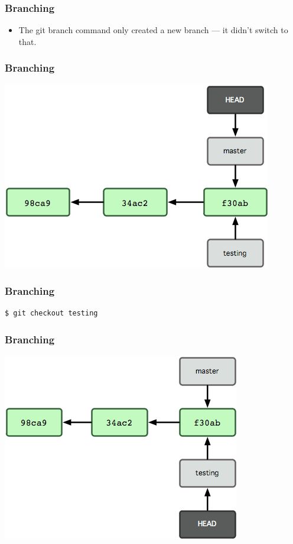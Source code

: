\documentclass{beamer}
\begin{document}
\begin{frame}
\frametitle{Branching}
\begin{itemize}
  \item The git branch command only created a new branch — it didn’t switch to
that.
\end{itemize}
\end{frame}

\begin{frame}
\frametitle{Branching}
\begin{center}
  \includegraphics[width=\textwidth,height=0.6\textheight,keepaspectratio]{imgs/branch04.png}
\end{center}
\end{frame}

\begin{frame}[fragile]
\frametitle{Branching}
\begin{lstlisting}
$ git checkout testing
\end{lstlisting}
\end{frame}

\begin{frame}
\frametitle{Branching}
\begin{center}
  \includegraphics[width=\textwidth,height=0.6\textheight,keepaspectratio]{imgs/branch05.png}
\end{center}
\end{frame}
\end{document}
